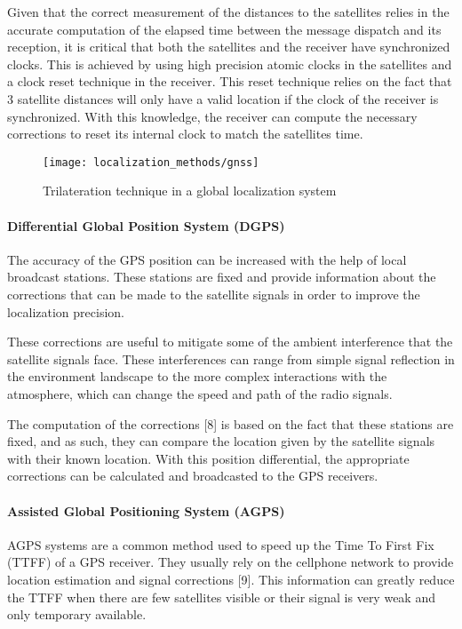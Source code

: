 Given that the correct measurement of the distances to the satellites relies in the accurate computation of the elapsed time between the message dispatch and its reception, it is critical that both the satellites and the receiver have synchronized clocks. This is achieved by using high precision atomic clocks in the satellites and a clock reset technique in the receiver. This reset technique relies on the fact that 3 satellite distances will only have a valid location if the clock of the receiver is synchronized. With this knowledge, the receiver can compute the necessary corrections to reset its internal clock to match the satellites time.

\begin{figure}[h]
	\centering
	\texttt{[image: localization\_methods/gnss]}
	\caption{Trilateration technique in a global localization system}
	\label{fig:localization-methods_gnss}
\end{figure}

\paragraph{Differential Global Position System (DGPS)}

The accuracy of the GPS position can be increased with the help of local broadcast stations. These stations are fixed and provide information about the corrections that can be made to the satellite signals in order to improve the localization precision.

These corrections are useful to mitigate some of the ambient interference that the satellite signals face. These interferences can range from simple signal reflection in the environment landscape to the more complex interactions with the atmosphere, which can change the speed and path of the radio signals.

The computation of the corrections [8] is based on the fact that these stations are fixed, and as such, they can compare the location given by the satellite signals with their known location. With this position differential, the appropriate corrections can be calculated and broadcasted to the GPS receivers.

\paragraph{Assisted Global Positioning System (AGPS)}

AGPS systems are a common method used to speed up the Time To First Fix (TTFF) of a GPS receiver. They usually rely on the cellphone network to provide location estimation and signal corrections [9]. This information can greatly reduce the TTFF when there are few satellites visible or their signal is very weak and only temporary available.

